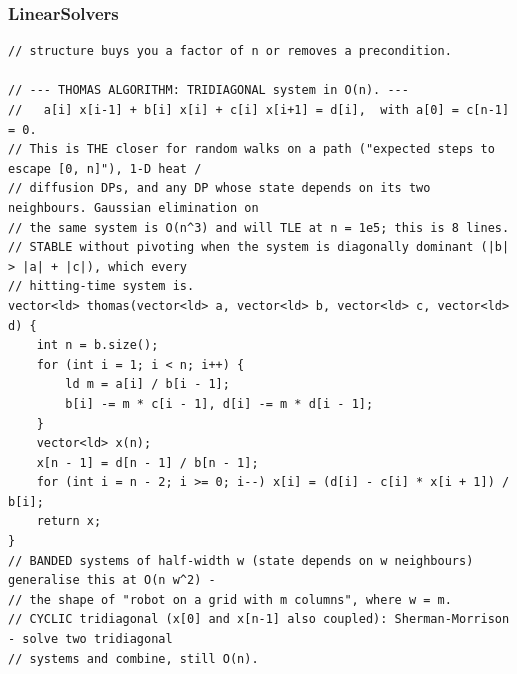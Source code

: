 \documentclass[9pt,a4paper,twocolumn]{extarticle}
\begin{document}
\subsubsection{LinearSolvers}
\nopagebreak
\begin{lstlisting}
// structure buys you a factor of n or removes a precondition.

// --- THOMAS ALGORITHM: TRIDIAGONAL system in O(n). ---
//   a[i] x[i-1] + b[i] x[i] + c[i] x[i+1] = d[i],  with a[0] = c[n-1] = 0.
// This is THE closer for random walks on a path ("expected steps to escape [0, n]"), 1-D heat /
// diffusion DPs, and any DP whose state depends on its two neighbours. Gaussian elimination on
// the same system is O(n^3) and will TLE at n = 1e5; this is 8 lines.
// STABLE without pivoting when the system is diagonally dominant (|b| > |a| + |c|), which every
// hitting-time system is.
vector<ld> thomas(vector<ld> a, vector<ld> b, vector<ld> c, vector<ld> d) {
    int n = b.size();
    for (int i = 1; i < n; i++) {
        ld m = a[i] / b[i - 1];
        b[i] -= m * c[i - 1], d[i] -= m * d[i - 1];
    }
    vector<ld> x(n);
    x[n - 1] = d[n - 1] / b[n - 1];
    for (int i = n - 2; i >= 0; i--) x[i] = (d[i] - c[i] * x[i + 1]) / b[i];
    return x;
}
// BANDED systems of half-width w (state depends on w neighbours) generalise this at O(n w^2) -
// the shape of "robot on a grid with m columns", where w = m.
// CYCLIC tridiagonal (x[0] and x[n-1] also coupled): Sherman-Morrison - solve two tridiagonal
// systems and combine, still O(n).


\end{lstlisting}
\end{document}
